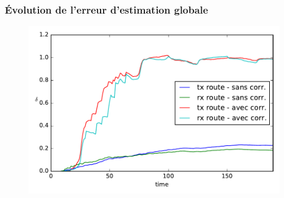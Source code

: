 \begin{frame}\frametitle{Évolution de l'erreur d'estimation globale}
  \begin{figure}[ht]
    \centering
    \includegraphics[width=\textwidth]{figures/mesure_active.pdf}
  \end{figure}
\end{frame}





